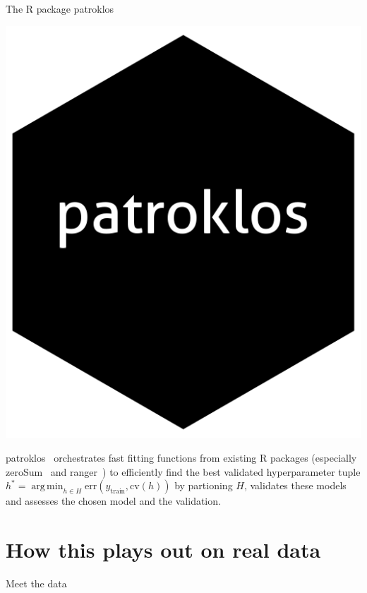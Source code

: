 \documentclass[10pt, aspectratio=169]{beamer}
\DeclareMathOperator*{\argmin}{arg\,min}
\begin{document}
\begin{frame}{The R package patroklos}
  \begin{minipage}{0.15\textwidth}
    \centering
    \includegraphics[width=\textwidth]{figs/logo.png}
  \end{minipage}
  \hfill
  \begin{minipage}{0.8\textwidth}
    \raggedright
    patroklos~\cite{patroklos} orchestrates fast fitting functions from existing 
    R packages (especially zeroSum~\cite{zerosumR} and ranger~\citep{ranger-gh}) 
    to efficiently find the best validated hyperparameter tuple
    $h^* = \argmin_{h \in H} \text{err}(y_\text{train}, \text{cv}(h))$ by 
    partioning $H$, validates these models and assesses the chosen model and 
    the validation.
  \end{minipage}
\end{frame}

\section{How this plays out on real data}

\begin{frame}{Meet the data}
  
\end{frame}
\end{document}
